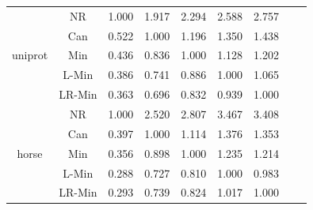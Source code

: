 \documentclass[11pt]{book}
\begin{document}
\begin{table}
\begin{tabular}{|c|c|c|c|c|c|c|c|c|}
    \hline
    \multirow{5}{*}{uniprot}
         & NR & 1.000 & 1.917 & 2.294 & 2.588 & 2.757 \\                                                                                                                                                             
         & Can & 0.522 & 1.000 & 1.196 & 1.350 & 1.438 \\                                                                                                                                                            
         & Min & 0.436 & 0.836 & 1.000 & 1.128 & 1.202 \\                                                                                                                                                            
         & L-Min & 0.386 & 0.741 & 0.886 & 1.000 & 1.065 \\                                                                                                                                                          
         & LR-Min & 0.363 & 0.696 & 0.832 & 0.939 & 1.000 \\
    
    \hline
    \multirow{5}{*}{horse}
         & NR & 1.000 & 2.520 & 2.807 & 3.467 & 3.408 \\                                                                                                                                                             
         & Can & 0.397 & 1.000 & 1.114 & 1.376 & 1.353 \\                                                                                                                                                            
         & Min & 0.356 & 0.898 & 1.000 & 1.235 & 1.214 \\                                                                                                                                                            
         & L-Min & 0.288 & 0.727 & 0.810 & 1.000 & 0.983 \\                                                                                                                                                          
         & LR-Min & 0.293 & 0.739 & 0.824 & 1.017 & 1.000 \\  
    

\end{tabular}
\end{table}
\end{document}
